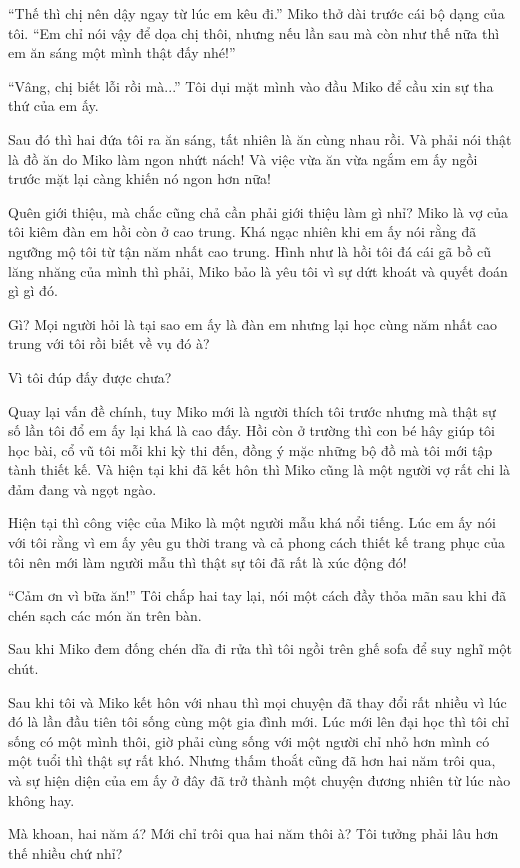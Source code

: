 {``Thế thì chị nên dậy ngay từ lúc em kêu đi.'' Miko thở dài trước cái bộ
dạng của tôi. ``Em chỉ nói vậy để dọa chị thôi, nhưng nếu lần sau mà còn
như thế nữa thì em ăn sáng một mình thật đấy nhé!''

``Vâng, chị biết lỗi rồi mà...'' Tôi dụi mặt mình vào đầu Miko để cầu
xin sự tha thứ của em ấy.

Sau đó thì hai đứa tôi ra ăn sáng, tất nhiên là ăn cùng nhau rồi. Và
phải nói thật là đồ ăn do Miko làm ngon nhứt nách! Và việc vừa ăn vừa
ngắm em ấy ngồi trước mặt lại càng khiến nó ngon hơn nữa!

Quên giới thiệu, mà chắc cũng chả cần phải giới thiệu làm gì nhỉ? Miko
là vợ của tôi kiêm đàn em hồi còn ở cao trung. Khá ngạc nhiên khi em ấy
nói rằng đã ngưỡng mộ tôi từ tận năm nhất cao trung. Hình như là hồi tôi
đá cái gã bồ cũ lăng nhăng của mình thì phải, Miko bảo là yêu tôi vì sự
dứt khoát và quyết đoán gì gì đó.

Gì? Mọi người hỏi là tại sao em ấy là đàn em nhưng lại học cùng năm nhất
cao trung với tôi rồi biết về vụ đó à?

Vì tôi đúp đấy được chưa?

Quay lại vấn đề chính, tuy Miko mới là người thích tôi trước nhưng mà
thật sự số lần tôi đổ em ấy lại khá là cao đấy. Hồi còn ở trường thì con
bé hây giúp tôi học bài, cổ vũ tôi mỗi khi kỳ thi đến, đồng ý mặc những
bộ đồ mà tôi mới tập tành thiết kế. Và hiện tại khi đã kết hôn thì Miko
cũng là một người vợ rất chi là đảm đang và ngọt ngào.

Hiện tại thì công việc của Miko là một người mẫu khá nổi tiếng. Lúc em
ấy nói với tôi rằng vì em ấy yêu gu thời trang và cả phong cách thiết kế
trang phục của tôi nên mới làm người mẫu thì thật sự tôi đã rất là xúc
động đó!

``Cảm ơn vì bữa ăn!'' Tôi chắp hai tay lại, nói một cách đầy thỏa mãn
sau khi đã chén sạch các món ăn trên bàn.

Sau khi Miko đem đống chén dĩa đi rửa thì tôi ngồi trên ghế sofa để suy
nghĩ một chút.

Sau khi tôi và Miko kết hôn với nhau thì mọi chuyện đã thay đổi rất
nhiều vì lúc đó là lần đầu tiên tôi sống cùng một gia đình mới. Lúc mới
lên đại học thì tôi chỉ sống có một mình thôi, giờ phải cùng sống với
một người chỉ nhỏ hơn mình có một tuổi thì thật sự rất khó. Nhưng thấm
thoắt cũng đã hơn hai năm trôi qua, và sự hiện diện của em ấy ở đây đã
trở thành một chuyện đương nhiên từ lúc nào không hay.

Mà khoan, hai năm á? Mới chỉ trôi qua hai năm thôi à? Tôi tưởng phải lâu
hơn thế nhiều chứ nhỉ?

}
